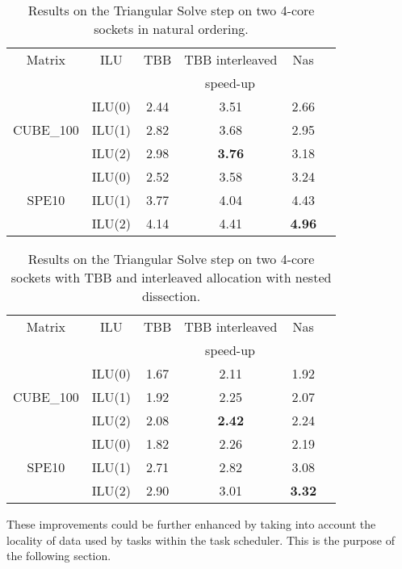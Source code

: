 \begin{table}[!h]
  \renewcommand{\arraystretch}{1.3}
  \caption{Results on the Triangular Solve step on two 4-core sockets in natural ordering.}
  \label{tab:full:8:solve:no}
  \centering
  \begin{tabular}{|c|c||c|c|c|c|}
    \hline
    Matrix & ILU & TBB & TBB interleaved & Nas\\
    &     &  \multicolumn{3}{c|}{speed-up}\\
    \hline
    \hline
    & ILU(0) &            2.44  &  3.51  &  2.66\\
    CUBE\_100 & ILU(1) &  2.82  &  3.68  &  2.95\\
    & ILU(2) &            2.98  &  {\bf 3.76}  &  3.18\\
    \hline
    & ILU(0) &            2.52  &  3.58  &  3.24\\
    SPE10     & ILU(1) &  3.77  &  4.04  &  4.43\\
    & ILU(2) &            4.14  &  4.41  &  {\bf 4.96}\\
    \hline
  \end{tabular}
\end{table}

\begin{table}[!h]
  \renewcommand{\arraystretch}{1.3}
  \caption{Results on the Triangular Solve step on two 4-core
    sockets with TBB and interleaved allocation with nested dissection.}
  \label{tab:full:8:solve:nested}
  \centering
  \begin{tabular}{|c|c||c|c|c|c|}
    \hline
    Matrix & ILU & TBB & TBB interleaved & Nas\\
    &     &  \multicolumn{3}{c|}{speed-up}\\
    \hline
    \hline
    & ILU(0) &            1.67  &  2.11  &  1.92\\
    CUBE\_100 & ILU(1) &  1.92  &  2.25  &  2.07\\
    & ILU(2) &            2.08  &  {\bf 2.42}  &  2.24\\
    \hline
    & ILU(0) &            1.82  &  2.26  &  2.19\\
    SPE10     & ILU(1) &  2.71  &  2.82  &  3.08\\
    & ILU(2) &            2.90  &  3.01  &  {\bf 3.32}\\
    \hline
  \end{tabular}
\end{table}

These improvements could be further enhanced by taking into account the locality of data 
used by tasks within the task scheduler. This is the purpose of the
following section.
